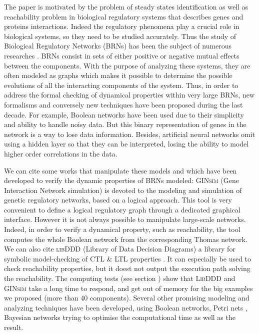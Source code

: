 The paper is motivated by the problem of steady states identification as well as reachability problem in biological regulatory systems that describes genes and proteins interactions. Indeed the regulatory phenomena play a crucial role in biological systems, so they need to be studied accurately. Thus the study of Biological Regulatory Networks (BRNs) has been the subject of numerous researches \cite{thieffry1999modularity, shermin20092, rauf2011formal}. BRNs consist in sets of either positive or negative mutual effects between the components. With the purpose of analyzing these systems, they are often modeled as graphs which makes it possible to determine the possible evolutions of all the interacting components of the system. Thus, in order to address the formal checking of dynamical properties within very large BRNs, new formalisms and conversely new techniques have been proposed during the last decade. For example, Boolean networks \cite{stuart1993origins, kauffman1969metabolic} have been used due to their simplicity and ability to handle noisy data. But this binary representation of genes in the network is a way to lose data information. Besides, artificial neural networks omit using a hidden layer so that they can be interpreted, losing the ability to model higher order correlations in the data.

We can cite some works that manipulate these models and which have been developed to verify the dynamic properties of BRNs modeled: \textsc{GINsim} (Gene Interaction Network simulation) \cite{chaouiya2012logical, gonzalez2006ginsim} is devoted to the modeling and simulation of genetic regulatory networks, based on a logical approach. This tool is very convenient  to define a logical regulatory graph through a dedicated graphical interface. However it is not always possible to manipulate large-scale networks. Indeed, in order to verify a dynamical property, such as reachability, the tool computes the whole Boolean network from the corresponding Thomas network.
We can also cite \textsc{libDDD} (Library of Data Decision Diagrams) a library for symbolic model-checking of CTL \& LTL properties \cite{libddd, Kordon09libddd}. It can especially be used to check reachability properties, but it doest not output the execution path solving the reachability. The computing tests (see section ) show that \textsc{LibDDD} and \textsc{GINsim} take a long time to respond, and get out of memory for the big examples we proposed (more than 40 components).  %
Several other promising modeling and analyzing techniques have been developed, using Boolean networks, Petri nets \cite{heljanko2001answer}, Bayesian networks \cite{numata2008partial} trying to optimise the computational time as well as the result. %

